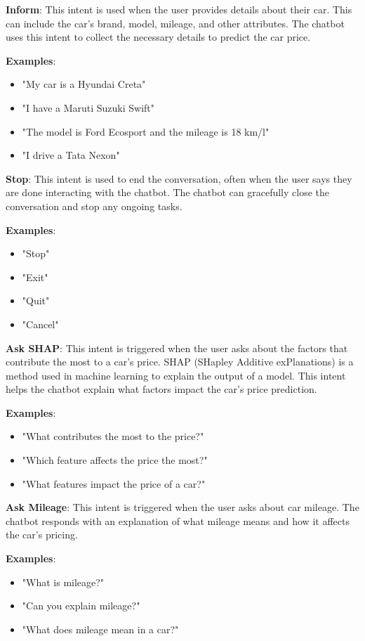\documentclass[a4paper,12pt]{article}
\begin{document}
\textbf{Inform}: This intent is used when the user provides details about their car. This can include the car’s brand, model, mileage, and other attributes. The chatbot uses this intent to collect the necessary details to predict the car price.

\textbf{Examples}:
\begin{itemize}
    \item "My car is a Hyundai Creta"
    \item "I have a Maruti Suzuki Swift"
    \item "The model is Ford Ecosport and the mileage is 18 km/l"
    \item "I drive a Tata Nexon"
\end{itemize}

\textbf{Stop}: This intent is used to end the conversation, often when the user says they are done interacting with the chatbot. The chatbot can gracefully close the conversation and stop any ongoing tasks.

\textbf{Examples}:
\begin{itemize}
    \item "Stop"
    \item "Exit"
    \item "Quit"
    \item "Cancel"
\end{itemize}

\textbf{Ask SHAP}: This intent is triggered when the user asks about the factors that contribute the most to a car’s price. SHAP (SHapley Additive exPlanations) is a method used in machine learning to explain the output of a model. This intent helps the chatbot explain what factors impact the car's price prediction.

\textbf{Examples}:
\begin{itemize}
    \item "What contributes the most to the price?"
    \item "Which feature affects the price the most?"
    \item "What features impact the price of a car?"
\end{itemize}

\textbf{Ask Mileage}: This intent is triggered when the user asks about car mileage. The chatbot responds with an explanation of what mileage means and how it affects the car's pricing.

\textbf{Examples}:
\begin{itemize}
    \item "What is mileage?"
    \item "Can you explain mileage?"
    \item "What does mileage mean in a car?"
\end{itemize}
\end{document}
